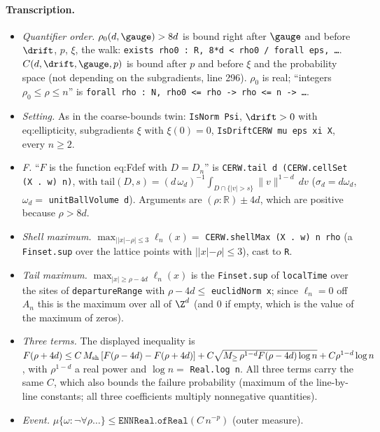 \paragraph{Transcription.}
\begin{itemize}
\item \emph{Quantifier order.} $\rho_0(d,\gauge)>8d$ is bound right after $\gauge$ and before $\drift$, $p$, $\xi$, the walk:
 \texttt{exists rho0 : R, 8*d < rho0 /\ forall eps, \dots}. $C(d,\drift,\gauge,p)$ is bound after $p$ and before $\xi$ and
 the probability space (not depending on the subgradients, line 296). $\rho_0$ is real; ``integers $\rho_0\le\rho\le n$'' is
 \texttt{forall rho : N, rho0 <= rho -> rho <= n -> \dots}.
\item \emph{Setting.} As in the coarse-bounds twin: \texttt{IsNorm Psi}, $\drift>0$ with eq:ellipticity, subgradients $\xi$ with
 $\xi(0)=0$, \texttt{IsDriftCERW mu eps xi X}, every $n\ge2$.
\item \emph{F.} ``$F$ is the function eq:Fdef with $D=D_n$'' is \texttt{CERW.tail d (CERW.cellSet (X . w) n)}, with
 $\mathrm{tail}(D,s)=(d\,\omega_d)^{-1}\int_{D\cap\{|v|>s\}}\|v\|^{1-d}\,dv$ ($\sigma_d=d\omega_d$, $\omega_d=$ \texttt{unitBallVolume d}).
 Arguments are $(\rho:\mathbb R)\pm4d$, which are positive because $\rho>8d$.
\item \emph{Shell maximum.} $\max_{||x|-\rho|\le3}\ell_n(x)=$ \texttt{CERW.shellMax (X . w) n rho} (a \texttt{Finset.sup} over the
 lattice points with $||x|-\rho|\le3$), cast to \texttt{R}.
\item \emph{Tail maximum.} $\max_{|x|\ge\rho-4d}\ell_n(x)$ is the \texttt{Finset.sup} of \texttt{localTime} over the sites of
 \texttt{departureRange} with $\rho-4d\le$ \texttt{euclidNorm x}; since $\ell_n=0$ off $A_n$ this is the maximum over all of $\Z^d$
 (and $0$ if empty, which is the value of the maximum of zeros).
\item \emph{Three terms.} The displayed inequality is $F(\rho+4d)\le C\,M_{\rm sh}\,[F(\rho-4d)-F(\rho+4d)]
 +C\sqrt{M_{\ge}\,\rho^{1-d}F(\rho-4d)\log n}+C\rho^{1-d}\log n$, with $\rho^{1-d}$ a real power and
 $\log n=$ \texttt{Real.log n}. All three terms carry the same $C$, which also bounds the failure probability
 (maximum of the line-by-line constants; all three coefficients multiply nonnegative quantities).
\item \emph{Event.} $\mu\{\omega:\neg\forall\rho\dots\}\le\texttt{ENNReal.ofReal}(C\,n^{-p})$ (outer measure).
\end{itemize}
